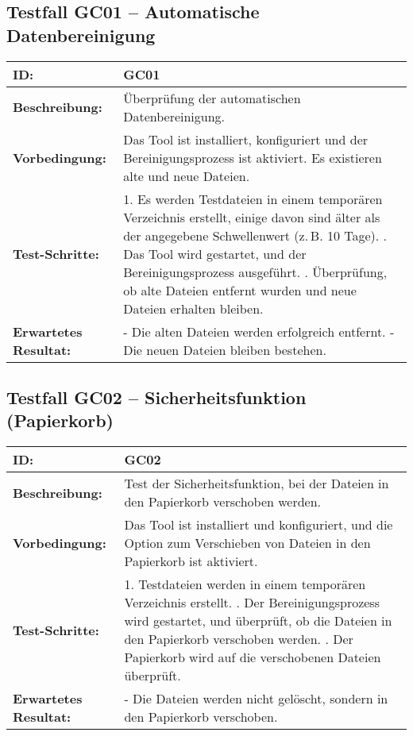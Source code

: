 

\subsection*{Testfall GC01 – Automatische Datenbereinigung}
\begin{tabular}{|p{4cm}|p{10cm}|}
\hline
 \textbf{ID:} & GC01 \\
\hline
\textbf{Beschreibung:} & Überprüfung der automatischen Datenbereinigung. \\
\hline
\textbf{Vorbedingung:} & Das Tool ist installiert, konfiguriert und der Bereinigungsprozess ist aktiviert. Es existieren alte und neue Dateien. \\
\hline
\textbf{Test-Schritte:} & 
1. Es werden Testdateien in einem temporären Verzeichnis erstellt, einige davon sind älter als der angegebene Schwellenwert (z.\,B. 10 Tage). \newline
2. Das Tool wird gestartet, und der Bereinigungsprozess ausgeführt. \newline
3. Überprüfung, ob alte Dateien entfernt wurden und neue Dateien erhalten bleiben. \\
\hline
\textbf{Erwartetes \newline Resultat:} & 
- Die alten Dateien werden erfolgreich entfernt. \newline
- Die neuen Dateien bleiben bestehen. \\
\hline
\end{tabular}

\vspace{1em}

\subsection*{Testfall GC02 – Sicherheitsfunktion (Papierkorb)}
\begin{tabular}{|p{4cm}|p{10cm}|}
\hline
\textbf{ID:} & GC02 \\
\hline
\textbf{Beschreibung:} & Test der Sicherheitsfunktion, bei der Dateien in den Papierkorb verschoben werden. \\
\hline
\textbf{Vorbedingung:} & Das Tool ist installiert und konfiguriert, und die Option zum Verschieben von Dateien in den Papierkorb ist aktiviert. \\
\hline
\textbf{Test-Schritte:} & 
1. Testdateien werden in einem temporären Verzeichnis erstellt. \newline
2. Der Bereinigungsprozess wird gestartet, und überprüft, ob die Dateien in den Papierkorb verschoben werden. \newline
3. Der Papierkorb wird auf die verschobenen Dateien überprüft. \\
\hline
\textbf{Erwartetes \newline Resultat:} & 
- Die Dateien werden nicht gelöscht, sondern in den Papierkorb verschoben. \\
\hline
\end{tabular}

